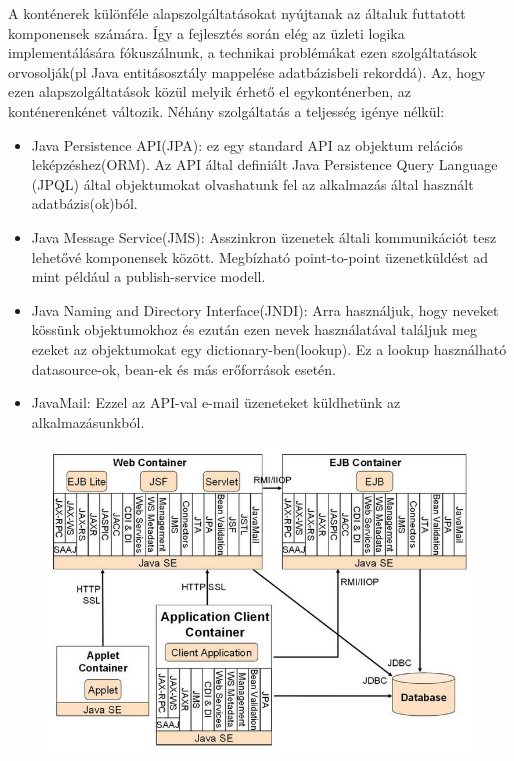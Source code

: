 \documentclass[centeredchapter]{thesis-ekf}
\theoremstyle{definition}
\theoremstyle{remark}
\begin{document}
A konténerek különféle alapszolgáltatásokat nyújtanak az általuk futtatott komponensek számára.
Így a fejlesztés során elég az üzleti logika implementálására fókuszálnunk, a technikai problémákat ezen szolgáltatások orvosolják(pl Java entitásosztály mappelése adatbázisbeli rekorddá).
Az, hogy ezen alapszolgáltatások közül melyik érhető el egykonténerben, az konténerenkénet változik.
Néhány szolgáltatás a teljesség igénye nélkül:
\begin{itemize}
	\item Java Persistence API(JPA): ez egy standard API az objektum relációs leképzéshez(ORM). Az API által definiált Java Persistence Query Language (JPQL) által objektumokat olvashatunk fel az alkalmazás által használt adatbázis(ok)ból.
	\item Java Message Service(JMS): Asszinkron üzenetek általi kommunikációt tesz lehetővé komponensek között. Megbízható point-to-point üzenetküldést ad mint például a publish-service modell.
	\item Java Naming and Directory Interface(JNDI): Arra használjuk, hogy neveket kössünk objektumokhoz és ezután ezen nevek használatával találjuk meg ezeket az objektumokat egy dictionary-ben(lookup). Ez a lookup használható datasource-ok, bean-ek és más erőforrások esetén.
	\item JavaMail: Ezzel az API-val e-mail üzeneteket küldhetünk az alkalmazásunkból.
	
\end{itemize}

\begin{figure}[!h]
	\centering
	\includegraphics[width=14cm]{kontener-szolgaltatasok.png}
\end{figure}
\end{document}
